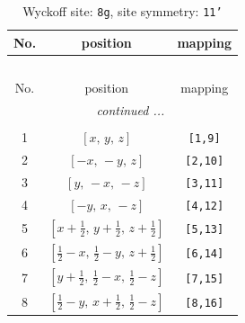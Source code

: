 \documentclass[fleqn,8pt]{jsarticle}
\begin{document}
\renewcommand{\arraystretch}{1.2}
\begin{longtable}{ccc}
\caption{Wyckoff site: {\tt 8g}, site symmetry: {\tt 11'}}
 \\
 \hline \hline
No. & position & mapping \\ \hline \endfirsthead

\multicolumn{2}{l}{\tablename\ \thetable{}} \\
 \hline \hline
No. & position & mapping \\ \hline \endhead

 \hline \hline
\multicolumn{2}{r}{\footnotesize\it continued ...} \\ \endfoot

 \hline \hline
\multicolumn{2}{r}{} \\ \endlastfoot

1 & $\left[ x,\, y,\, z \right]$ & {\tt [1,9]} \\ \hline
2 & $\left[ - x,\, - y,\, z \right]$ & {\tt [2,10]} \\ \hline
3 & $\left[ y,\, - x,\, - z \right]$ & {\tt [3,11]} \\ \hline
4 & $\left[ - y,\, x,\, - z \right]$ & {\tt [4,12]} \\ \hline
5 & $\left[ x + \frac{1}{2},\, y + \frac{1}{2},\, z + \frac{1}{2} \right]$ & {\tt [5,13]} \\ \hline
6 & $\left[ \frac{1}{2} - x,\, \frac{1}{2} - y,\, z + \frac{1}{2} \right]$ & {\tt [6,14]} \\ \hline
7 & $\left[ y + \frac{1}{2},\, \frac{1}{2} - x,\, \frac{1}{2} - z \right]$ & {\tt [7,15]} \\ \hline
8 & $\left[ \frac{1}{2} - y,\, x + \frac{1}{2},\, \frac{1}{2} - z \right]$ & {\tt [8,16]} \\
\end{longtable}
\end{document}
